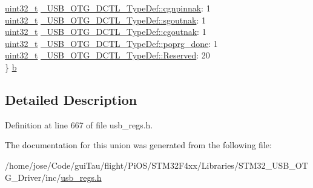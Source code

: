 \begin{DoxyCompactItemize}
\begin{tabbing}
\>\hyperlink{stdint_8h_a435d1572bf3f880d55459d9805097f62}{uint32\_t} \hyperlink{group___u_s_b___o_t_g___d_r_i_v_e_r_ga41d7827ced20eb92bcb20d8a1afc1fe9}{\_USB\_OTG\_DCTL\_TypeDef::cgnpinnak}: 1\\
\>\hyperlink{stdint_8h_a435d1572bf3f880d55459d9805097f62}{uint32\_t} \hyperlink{group___u_s_b___o_t_g___d_r_i_v_e_r_ga1f7b8be5eec6ec007263d62310d0a463}{\_USB\_OTG\_DCTL\_TypeDef::sgoutnak}: 1\\
\>\hyperlink{stdint_8h_a435d1572bf3f880d55459d9805097f62}{uint32\_t} \hyperlink{group___u_s_b___o_t_g___d_r_i_v_e_r_ga1b74633ad9483a5f99ade463d5461b23}{\_USB\_OTG\_DCTL\_TypeDef::cgoutnak}: 1\\
\>\hyperlink{stdint_8h_a435d1572bf3f880d55459d9805097f62}{uint32\_t} \hyperlink{group___u_s_b___o_t_g___d_r_i_v_e_r_ga1a3fdc8b6bd4f3d9e43f18c398f8cad9}{\_USB\_OTG\_DCTL\_TypeDef::poprg\_done}: 1\\
\>\hyperlink{stdint_8h_a435d1572bf3f880d55459d9805097f62}{uint32\_t} \hyperlink{group___u_s_b___o_t_g___d_r_i_v_e_r_ga5e233f2b38a4586c46fc4b90ec1a5490}{\_USB\_OTG\_DCTL\_TypeDef::Reserved}: 20\\
\} \hyperlink{group___u_s_b___o_t_g___d_r_i_v_e_r_gac136c45fe7899967aa69144f97415c0b}{b}\\

\end{tabbing}\end{DoxyCompactItemize}


\subsection{Detailed Description}


Definition at line 667 of file usb\-\_\-regs.\-h.



The documentation for this union was generated from the following file\-:\begin{DoxyCompactItemize}
\item 
/home/jose/\-Code/gui\-Tau/flight/\-Pi\-O\-S/\-S\-T\-M32\-F4xx/\-Libraries/\-S\-T\-M32\-\_\-\-U\-S\-B\-\_\-\-O\-T\-G\-\_\-\-Driver/inc/\hyperlink{_s_t_m32_f4xx_2_libraries_2_s_t_m32___u_s_b___o_t_g___driver_2inc_2usb__regs_8h}{usb\-\_\-regs.\-h}\end{DoxyCompactItemize}
